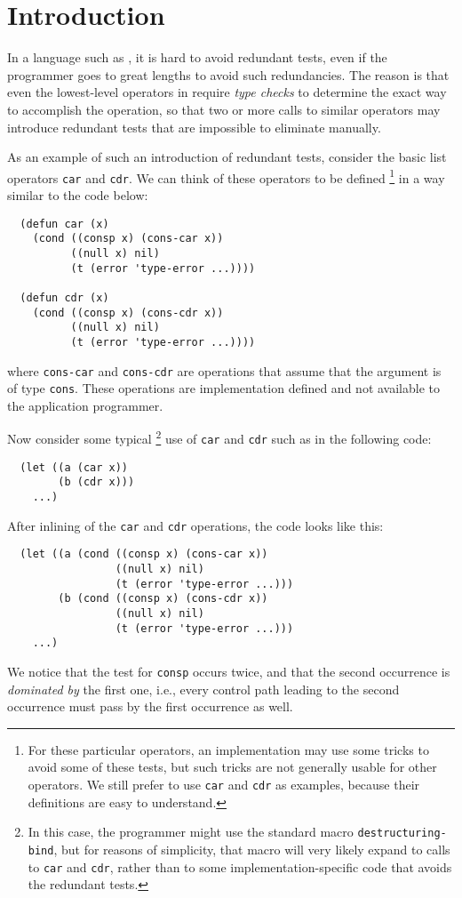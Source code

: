 \section{Introduction}

In a language such as \commonlisp{}, it is hard to avoid redundant
tests, even if the programmer goes to great lengths to avoid such
redundancies.  The reason is that even the lowest-level operators in
\commonlisp{} require \emph{type checks} to determine the exact way to
accomplish the operation, so that two or more calls to similar
operators may introduce redundant tests that are impossible to
eliminate manually.

As an example of such an introduction of redundant tests, consider the
basic list operators \texttt{car} and \texttt{cdr}.  We can think of
these operators to be defined%
\footnote{For these particular operators, an implementation may use
  some tricks to avoid some of these tests, but such tricks are not
  generally usable for other operators.  We still prefer to use
  \texttt{car} and \texttt{cdr} as examples, because their definitions
  are easy to understand.}
in a way similar to the code below:

\begin{verbatim}
  (defun car (x)
    (cond ((consp x) (cons-car x))
          ((null x) nil)
          (t (error 'type-error ...))))

  (defun cdr (x)
    (cond ((consp x) (cons-cdr x))
          ((null x) nil)
          (t (error 'type-error ...))))
\end{verbatim}

\noindent
where \texttt{cons-car} and \texttt{cons-cdr} are operations that
assume that the argument is of type \texttt{cons}.  These operations
are implementation defined and not available to the application
programmer.

Now consider some typical%
\footnote{In this case, the programmer might use the standard macro
  \texttt{destructuring-bind}, but for reasons of simplicity, that
  macro will very likely expand to calls to \texttt{car} and
  \texttt{cdr}, rather than to some implementation-specific code that
  avoids the redundant tests.}
use of \texttt{car} and \texttt{cdr} such as
in the following code:

\begin{verbatim}
  (let ((a (car x))
        (b (cdr x)))
    ...)
\end{verbatim}

After inlining of the \texttt{car} and \texttt{cdr} operations, the
code looks like this:

\begin{verbatim}
  (let ((a (cond ((consp x) (cons-car x))
                 ((null x) nil)
                 (t (error 'type-error ...)))
        (b (cond ((consp x) (cons-cdr x))
                 ((null x) nil)
                 (t (error 'type-error ...)))
    ...)
\end{verbatim}

We notice that the test for \texttt{consp} occurs twice, and that the
second occurrence is \emph{dominated by} the first one, i.e., every
control path leading to the second occurrence must pass by the first
occurrence as well.
